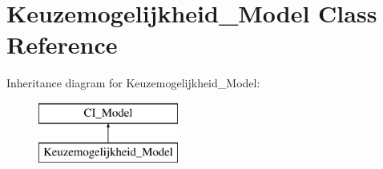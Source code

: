 \hypertarget{class_keuzemogelijkheid___model}{}\section{Keuzemogelijkheid\+\_\+\+Model Class Reference}
\label{class_keuzemogelijkheid___model}
Inheritance diagram for Keuzemogelijkheid\+\_\+\+Model\+:\begin{figure}[H]
\begin{center}
\leavevmode
\includegraphics[height=2.000000cm]{class_keuzemogelijkheid___model}
\end{center}
\end{figure}
